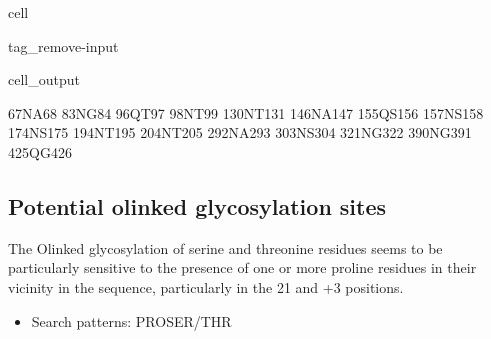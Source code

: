 \documentclass[letterpaper,10pt,english]{jupyterBook}
\begin{document}
\begin{sphinxuseclass}{cell}
\begin{sphinxuseclass}{tag_remove-input}\begin{sphinxVerbatimOutput}

\begin{sphinxuseclass}{cell_output}
\begin{sphinxVerbatim}[commandchars=\\\{\}]
67\PYGZhy{}NA\PYGZhy{}68
83\PYGZhy{}NG\PYGZhy{}84
96\PYGZhy{}QT\PYGZhy{}97
98\PYGZhy{}NT\PYGZhy{}99
130\PYGZhy{}NT\PYGZhy{}131
146\PYGZhy{}NA\PYGZhy{}147
155\PYGZhy{}QS\PYGZhy{}156
157\PYGZhy{}NS\PYGZhy{}158
174\PYGZhy{}NS\PYGZhy{}175
194\PYGZhy{}NT\PYGZhy{}195
204\PYGZhy{}NT\PYGZhy{}205
292\PYGZhy{}NA\PYGZhy{}293
303\PYGZhy{}NS\PYGZhy{}304
321\PYGZhy{}NG\PYGZhy{}322
390\PYGZhy{}NG\PYGZhy{}391
425\PYGZhy{}QG\PYGZhy{}426
\end{sphinxVerbatim}

\end{sphinxuseclass}\end{sphinxVerbatimOutput}

\end{sphinxuseclass}
\end{sphinxuseclass}

\subsection{Potential o\sphinxhyphen{}linked glycosylation sites}
\label{\detokenize{ipynb/chapter1:potential-o-linked-glycosylation-sites}}
\sphinxAtStartPar
The O\sphinxhyphen{}linked glycosylation of serine and threonine residues seems to be particularly sensitive to the presence of one or more proline residues in their vicinity in the sequence, particularly in the 2\sphinxhyphen{}1 and +3 positions.
\begin{itemize}
\item {} 
\sphinxAtStartPar
Search patterns: PRO\sphinxhyphen{}SER/THR

\end{itemize}
\end{document}
